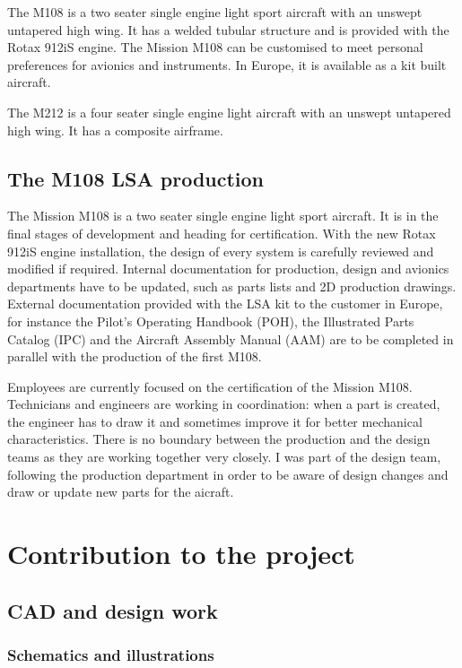\documentclass[11pt,a4paper]{article}
\begin{document}
The M108 is a two seater single engine light sport aircraft with an unswept untapered high wing. It has a welded tubular structure and is provided with the Rotax 912iS engine. The Mission M108 can be customised to meet personal preferences for avionics and instruments. In Europe, it is available as a kit built aircraft.

\bigskip

The M212 is a four seater single engine light aircraft with an unswept untapered high wing. It has a composite airframe.

\subsection{The M108 LSA production}
The Mission M108 is a two seater single engine light sport aircraft. It is in the final stages of development and heading for certification. With the new Rotax 912iS engine installation, the design of every system is carefully reviewed and modified if required. Internal documentation for production, design and avionics departments have to be updated, such as parts lists and 2D production drawings. External documentation provided with the LSA kit to the customer in Europe, for instance the Pilot's Operating Handbook (POH), the Illustrated Parts Catalog (IPC) and the Aircraft Assembly Manual (AAM) are to be completed in parallel with the production of the first M108.

\bigskip

Employees are currently focused on the certification of the Mission M108. Technicians and engineers are working in coordination: when a part is created, the engineer has to draw it and sometimes improve it for better mechanical characteristics. There is no boundary between the production and the design teams as they are working together very closely. I was part of the design team, following the production department in order to be aware of design changes and draw or update new parts for the aicraft.

\newpage

\section{Contribution to the project}
\subsection{CAD and design work}
\subsubsection{Schematics and illustrations}
\end{document}
